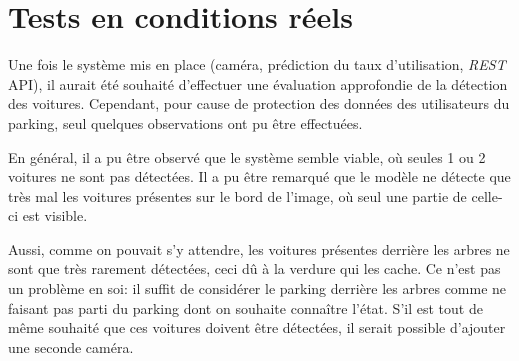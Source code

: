 \section{Tests en conditions réels}
Une fois le système mis en place (caméra, prédiction du taux d'utilisation, \textit{REST} API), il aurait été souhaité d'effectuer une évaluation approfondie de la détection des voitures. Cependant, pour cause de protection des données des utilisateurs du parking, seul quelques observations ont pu être effectuées. 

En général, il a pu être observé que le système semble viable, où seules 1 ou 2 voitures ne sont pas détectées. Il a pu être remarqué que le modèle ne détecte que très mal les voitures présentes sur le bord de l'image, où seul une partie de celle-ci est visible. 

Aussi, comme on pouvait s'y attendre, les voitures présentes derrière les arbres ne sont que très rarement détectées, ceci dû à la verdure qui les cache.  Ce n'est pas un problème en soi: il suffit de considérer le parking derrière les arbres comme ne faisant pas parti du parking dont on souhaite connaître l'état. S'il est tout de même souhaité que ces voitures doivent être détectées, il serait possible d'ajouter une seconde caméra.
